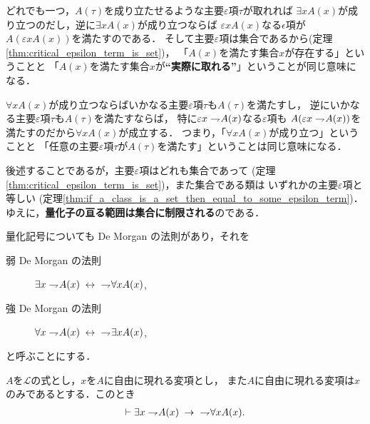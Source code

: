 	どれでも一つ，$A(\tau)$を成り立たせるような主要$\varepsilon$項$\tau$が取れれば
	$\exists x A(x)$が成り立つのだし，逆に$\exists x A(x)$が成り立つならば
	$\varepsilon x A(x)$なる$\epsilon$項が$A(\varepsilon x A(x))$を満たすのである．
	そして主要$\varepsilon$項は集合であるから(定理\ref{thm:critical_epsilon_term_is_set})，
	「$A(x)$を満たす集合$x$が存在する」ということと
	「$A(x)$を満たす集合$x$が{\bf ``実際に取れる''}」ということが同じ意味になる．
	
	$\forall x A(x)$が成り立つならばいかなる主要$\varepsilon$項$\tau$も$A(\tau)$を満たすし，
	逆にいかなる主要$\varepsilon$項$\tau$も$A(\tau)$を満たすならば，
	特に$\varepsilon x \rightharpoondown\hspace{-0.25em} A(x)$なる$\varepsilon$項も
	$A(\varepsilon x \rightharpoondown\hspace{-0.25em} A(x))$を満たすのだから$\forall x A(x)$が成立する．
	つまり，「$\forall x A(x)$が成り立つ」ということと
	「任意の主要$\varepsilon$項$\tau$が$A(\tau)$を満たす」ということは同じ意味になる．
	
	後述することであるが，主要$\varepsilon$項はどれも集合であって
	(定理\ref{thm:critical_epsilon_term_is_set})，また集合である類は
	いずれかの主要$\varepsilon$項と等しい
	(定理\ref{thm:if_a_class_is_a_set_then_equal_to_some_epsilon_term})．
	ゆえに，{\bf 量化子の亘る範囲は集合に制限される}のである．
	
	量化記号についても De Morgan の法則があり，それを
	\begin{description}
		\item[弱 De Morgan の法則] $\exists x \negation A(x) \lrarrow\ \negation \forall x A(x)$,
		\item[強 De Morgan の法則] $\forall x \negation A(x) \lrarrow\ \negation \exists x A(x)$,
	\end{description}
	と呼ぶことにする．
	
	\begin{screen}
		\begin{logicalthm}
		\label{logicalthm:weak_De_Morgan_law_for_quantifiers_1}
			$A$を$\mathcal{L}$の式とし，$x$を$A$に自由に現れる変項とし，
			また$A$に自由に現れる変項は$x$のみであるとする．このとき
			\begin{align}
				\vdash \exists x \rightharpoondown\hspace{-0.25em} A(x) \hspace{0.25em}\rightarrow\hspace{0.25em}\ \rightharpoondown\hspace{-0.25em} \forall x A(x).
			\end{align}
		\end{logicalthm}
	\end{screen}
	
